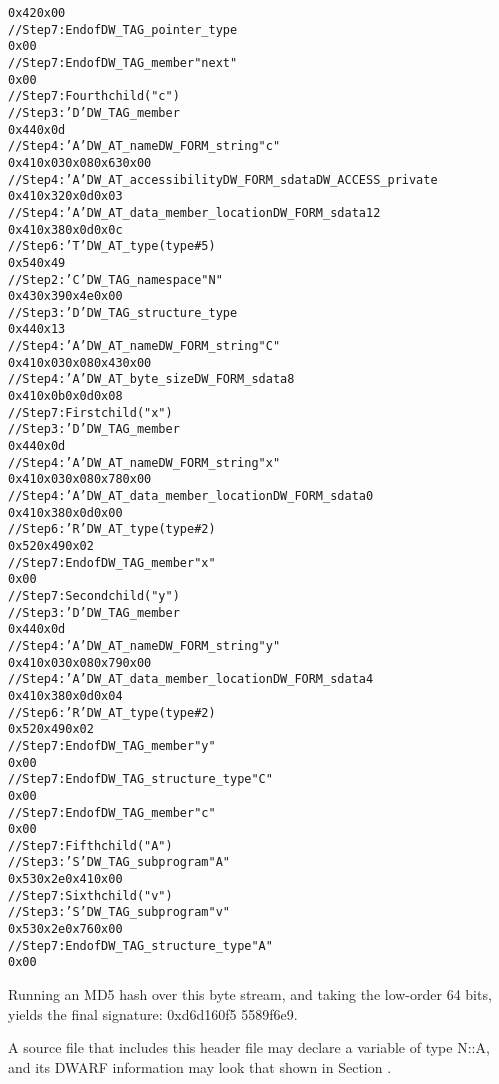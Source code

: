\begin{alltt}
        0x42 0x00
        // Step 7: End of DW\_TAG\_pointer\_type
        0x00
    // Step 7: End of DW\_TAG\_member "next"
    0x00
// Step 7: Fourth child ("c")
    // Step 3: 'D' DW\_TAG\_member
    0x44 0x0d
    // Step 4: 'A' DW\_AT\_name DW\_FORM\_string "c"
    0x41 0x03 0x08 0x63 0x00
    // Step 4: 'A' DW\_AT\_accessibility DW\_FORM\_sdata DW\_ACCESS\_private
    0x41 0x32 0x0d 0x03
    // Step 4: 'A' DW\_AT\_data\_member\_location DW\_FORM\_sdata 12
    0x41 0x38 0x0d 0x0c
    // Step 6: 'T' DW\_AT\_type (type \#5)
    0x54 0x49
        // Step 2: 'C' DW\_TAG\_namespace "N"
        0x43 0x39 0x4e 0x00
        // Step 3: 'D' DW\_TAG\_structure\_type
        0x44 0x13
        // Step 4: 'A' DW\_AT\_name DW\_FORM\_string "C"
        0x41 0x03 0x08 0x43 0x00
        // Step 4: 'A' DW\_AT\_byte\_size DW\_FORM\_sdata 8
        0x41 0x0b 0x0d 0x08
        // Step 7: First child ("x")
            // Step 3: 'D' DW\_TAG\_member
            0x44 0x0d
            // Step 4: 'A' DW\_AT\_name DW\_FORM\_string "x"
            0x41 0x03 0x08 0x78 0x00
            // Step 4: 'A' DW\_AT\_data\_member\_location DW\_FORM\_sdata 0
            0x41 0x38 0x0d 0x00
            // Step 6: 'R' DW\_AT\_type (type \#2)
            0x52 0x49 0x02
            // Step 7: End of DW\_TAG\_member "x"
            0x00
        // Step 7: Second child ("y")
            // Step 3: 'D' DW\_TAG\_member
            0x44 0x0d
            // Step 4: 'A' DW\_AT\_name DW\_FORM\_string "y"
            0x41 0x03 0x08 0x79 0x00
            // Step 4: 'A' DW\_AT\_data\_member\_location DW\_FORM\_sdata 4
            0x41 0x38 0x0d 0x04
            // Step 6: 'R' DW\_AT\_type (type \#2)
            0x52 0x49 0x02
            // Step 7: End of DW\_TAG\_member "y"
            0x00
        // Step 7: End of DW\_TAG\_structure\_type "C"
        0x00
    // Step 7: End of DW\_TAG\_member "c"
    0x00
// Step 7: Fifth child ("A")
    // Step 3: 'S' DW\_TAG\_subprogram "A"
    0x53 0x2e 0x41 0x00
// Step 7: Sixth child ("v")
    // Step 3: 'S' DW\_TAG\_subprogram "v"
    0x53 0x2e 0x76 0x00
// Step 7: End of DW\_TAG\_structure\_type "A"
0x00
\end{alltt}

Running an MD5 hash over this byte stream, and taking the
low-order 64 bits, yields the final signature: 0xd6d160f5
5589f6e9.


A source file that includes this header file may declare a
variable of type N::A, and its DWARF information may look
that shown in 
Section .


